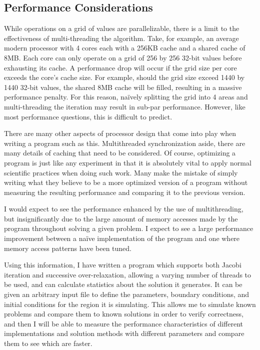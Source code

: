 \subsection{Performance Considerations}
While operations on a grid of values are parallelizable, there is a limit to
the effectiveness of multi-threading the algorithm. Take, for example, an average
modern processor with 4 cores each with a 256KB cache and a shared cache of 8MB\@. Each core
can only operate on a grid of 256 by 256 32-bit values before exhausting its cache.
A performance drop will occur if the grid size per core exceeds the core's cache
size. For example, should the grid size exceed 1440 by 1440 32-bit values,
the shared 8MB cache will
be filled, resulting in a massive performance penalty. For this reason, na\"{i}vely splitting
the grid into 4 areas and multi-threading the iteration may result in sub-par performance.
However, like most performance questions, this is difficult to predict.

There are many other aspects of processor design that come into play when writing a program
such as this. Multithreaded synchronization aside, there are many details of caching that
need to be considered. Of course, optimizing a program is just like any experiment in that
it is absolutely vital to apply normal scientific practices when doing such work. Many make
the mistake of simply writing what they believe to be a more optimized version of a program
without measuring the resulting performance and comparing it to the previous version.

I would expect to see the performance enhanced by the use of multithreading, but insignificantly
due to the large amount of memory accesses made by the program throughout solving a given problem.
I expect to see a large performance improvement between a na\"{i}ve implementation of the program
and one where memory access patterns have been tuned.


\vspace{10mm}

Using this information, I have written a program which supports both Jacobi iteration and successive over-relaxation,
allowing a varying number of threads to be used, and can calculate statistics about the solution it generates.
It can be given an arbitrary input file to define the parameters, boundary conditions, and initial conditions for
the region it is simulating. This allows me to simulate known problems and compare them to known solutions in order
to verify correctness, and then I will be able
to measure the performance characteristics of different implementations and solution methods with different parameters
and compare them to see which are faster.
